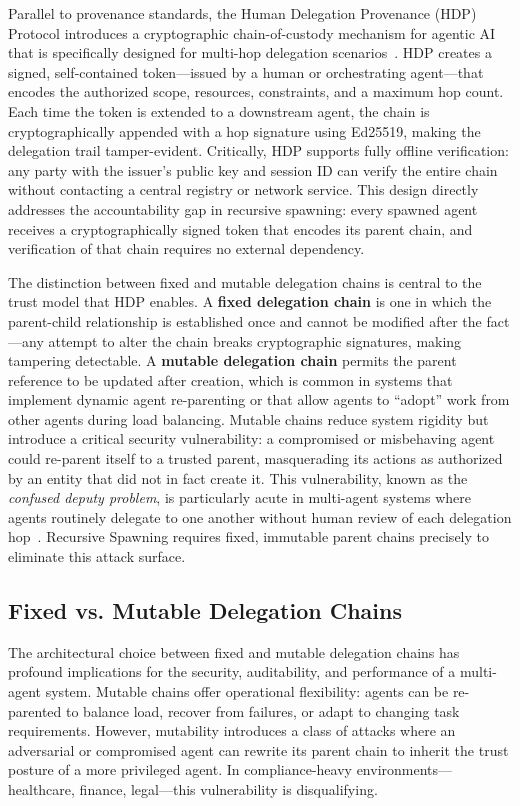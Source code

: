 Parallel to provenance standards, the Human Delegation Provenance (HDP) Protocol introduces a cryptographic chain-of-custody mechanism for agentic AI that is specifically designed for multi-hop delegation scenarios~\cite{hdp_helixar_2025}. HDP creates a signed, self-contained token—issued by a human or orchestrating agent—that encodes the authorized scope, resources, constraints, and a maximum hop count. Each time the token is extended to a downstream agent, the chain is cryptographically appended with a hop signature using Ed25519, making the delegation trail tamper-evident. Critically, HDP supports fully offline verification: any party with the issuer's public key and session ID can verify the entire chain without contacting a central registry or network service. This design directly addresses the accountability gap in recursive spawning: every spawned agent receives a cryptographically signed token that encodes its parent chain, and verification of that chain requires no external dependency.

The distinction between fixed and mutable delegation chains is central to the trust model that HDP enables. A \textbf{fixed delegation chain} is one in which the parent-child relationship is established once and cannot be modified after the fact—any attempt to alter the chain breaks cryptographic signatures, making tampering detectable. A \textbf{mutable delegation chain} permits the parent reference to be updated after creation, which is common in systems that implement dynamic agent re-parenting or that allow agents to ``adopt'' work from other agents during load balancing. Mutable chains reduce system rigidity but introduce a critical security vulnerability: a compromised or misbehaving agent could re-parent itself to a trusted parent, masquerading its actions as authorized by an entity that did not in fact create it. This vulnerability, known as the \textit{confused deputy problem}, is particularly acute in multi-agent systems where agents routinely delegate to one another without human review of each delegation hop~\cite{hdp_autogen_2025}. Recursive Spawning requires fixed, immutable parent chains precisely to eliminate this attack surface.

\subsection{Fixed vs. Mutable Delegation Chains}

The architectural choice between fixed and mutable delegation chains has profound implications for the security, auditability, and performance of a multi-agent system. Mutable chains offer operational flexibility: agents can be re-parented to balance load, recover from failures, or adapt to changing task requirements. However, mutability introduces a class of attacks where an adversarial or compromised agent can rewrite its parent chain to inherit the trust posture of a more privileged agent. In compliance-heavy environments—healthcare, finance, legal—this vulnerability is disqualifying.

